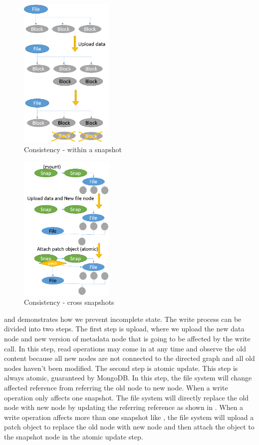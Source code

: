 \begin{figure}[t]
\centering
\includegraphics[width=0.4\textwidth]{Chapter-3/figs/fig27.png}
\caption{Consistency - within a snapshot}
\label{fig:consist1}
\end{figure}

\begin{figure}[t]
\centering
\includegraphics[width=0.4\textwidth]{Chapter-3/figs/fig28.png}
\caption{Consistency - cross snapshots}
\label{fig:consist2}
\end{figure}

     and  demonstrates how we prevent incomplete state. The write process can be divided into two steps. The first step is upload, where we upload the new data node and new version of metadata node that is going to be affected by the write call. In this step, read operations may come in at any time and observe the old content because all new nodes are not connected to the directed graph and all old nodes haven't been modified. The second step is atomic update. This step is always atomic, guaranteed by MongoDB. In this step, the file system will change affected reference from referring the old node to new node. When a write operation only affects one snapshot. The file system will directly replace the old node with new node by updating the referring reference as shown in . When a write operation affects more than one snapshot like , the file system will upload a patch object to replace the old node with new node and then attach the object to the snapshot node in the atomic update step.

